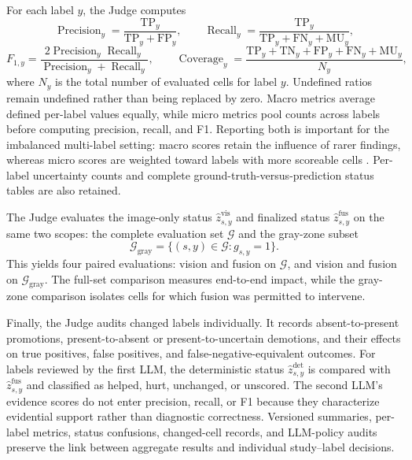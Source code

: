 For each label $y$, the Judge computes
\[
\operatorname{Precision}_y=
\frac{\mathrm{TP}_y}{\mathrm{TP}_y+\mathrm{FP}_y},
\qquad
\operatorname{Recall}_y=
\frac{\mathrm{TP}_y}
{\mathrm{TP}_y+\mathrm{FN}_y+\mathrm{MU}_y},
\]
\[
F_{1,y}=
\frac{2\operatorname{Precision}_y\operatorname{Recall}_y}
{\operatorname{Precision}_y+\operatorname{Recall}_y},
\qquad
\operatorname{Coverage}_y=
\frac{\mathrm{TP}_y+\mathrm{TN}_y+\mathrm{FP}_y+\mathrm{FN}_y+\mathrm{MU}_y}
{N_y},
\]
where $N_y$ is the total number of evaluated cells for label $y$. Undefined ratios remain undefined rather than being replaced by zero. Macro metrics average defined per-label values equally, while micro metrics pool counts across labels before computing precision, recall, and F1. Reporting both is important for the imbalanced multi-label setting: macro scores retain the influence of rarer findings, whereas micro scores are weighted toward labels with more scoreable cells \cite{davis2006relationship,zhang2020convex}. Per-label uncertainty counts and complete ground-truth-versus-prediction status tables are also retained.

The Judge evaluates the image-only status $\widehat z^{\mathrm{vis}}_{s,y}$ and finalized status $\widehat z^{\mathrm{fus}}_{s,y}$ on the same two scopes: the complete evaluation set $\mathcal G$ and the gray-zone subset
\[
\mathcal G_{\mathrm{gray}}=
\{(s,y)\in\mathcal G:g_{s,y}=1\}.
\]
This yields four paired evaluations: vision and fusion on $\mathcal G$, and vision and fusion on $\mathcal G_{\mathrm{gray}}$. The full-set comparison measures end-to-end impact, while the gray-zone comparison isolates cells for which fusion was permitted to intervene.

Finally, the Judge audits changed labels individually. It records absent-to-present promotions, present-to-absent or present-to-uncertain demotions, and their effects on true positives, false positives, and false-negative-equivalent outcomes. For labels reviewed by the first LLM, the deterministic status $\widehat z^{\mathrm{det}}_{s,y}$ is compared with $\widehat z^{\mathrm{fus}}_{s,y}$ and classified as helped, hurt, unchanged, or unscored. The second LLM's evidence scores do not enter precision, recall, or F1 because they characterize evidential support rather than diagnostic correctness. Versioned summaries, per-label metrics, status confusions, changed-cell records, and LLM-policy audits preserve the link between aggregate results and individual study--label decisions.
